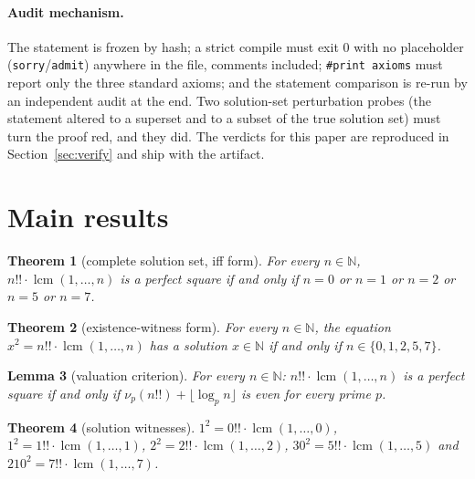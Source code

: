 \documentclass[11pt]{article}
\newtheorem{theorem}{Theorem}
\newtheorem{lemma}[theorem]{Lemma}
\theoremstyle{definition}
\begin{document}
\paragraph{Audit mechanism.} The statement is frozen by hash; a strict compile
must exit $0$ with no placeholder (\texttt{sorry}/\texttt{admit}) anywhere in
the file, comments included; \texttt{\#print axioms} must report only the
three standard axioms; and the statement comparison is re-run by an
independent audit at the end. Two solution-set perturbation probes (the
statement altered to a superset and to a subset of the true solution set)
must turn the proof red, and they did. The verdicts for this paper are
reproduced in Section~\ref{sec:verify} and ship with the artifact.

\section{Main results}\label{sec:results}

\begin{theorem}[complete solution set, iff form]\label{thm:main}
For every $n \in \mathbb{N}$, $n!! \cdot \operatorname{lcm}(1,\dots,n)$ is a
perfect square if and only if $n = 0$ or $n = 1$ or $n = 2$ or $n = 5$ or
$n = 7$.
\end{theorem}

\begin{theorem}[existence-witness form]\label{thm:exists}
For every $n \in \mathbb{N}$, the equation
$x^2 = n!! \cdot \operatorname{lcm}(1,\dots,n)$ has a solution
$x \in \mathbb{N}$ if and only if $n \in \{0,1,2,5,7\}$.
\end{theorem}

\begin{lemma}[valuation criterion]\label{lem:A}
For every $n \in \mathbb{N}$: $n!! \cdot \operatorname{lcm}(1,\dots,n)$ is a
perfect square if and only if $\nu_p(n!!) + \lfloor \log_p n \rfloor$ is even
for every prime $p$.
\end{lemma}

\begin{theorem}[solution witnesses]\label{thm:witnesses}
$1^2 = 0!! \cdot \operatorname{lcm}(1,\dots,0)$,
$1^2 = 1!! \cdot \operatorname{lcm}(1,\dots,1)$,
$2^2 = 2!! \cdot \operatorname{lcm}(1,\dots,2)$,
$30^2 = 5!! \cdot \operatorname{lcm}(1,\dots,5)$ and
$210^2 = 7!! \cdot \operatorname{lcm}(1,\dots,7)$.
\end{theorem}
\end{document}
